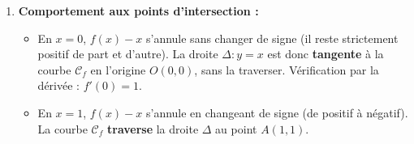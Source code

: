 \documentclass[11pt,a4paper]{article}
\begin{document}
\begin{correctionbox}[Exercice 7]
\begin{enumerate}[label=\textbf{\arabic*.}]
\begin{itemize}
        \begin{itemize}
            \item Sur $]-\infty, 0[ \cup ]0, 1[$, $f(x) - x > 0$ : la courbe $\mathcal{C}_f$ est \textbf{strictement au-dessus} de la droite $\Delta$.
            \item Sur $]1, +\infty[$, $f(x) - x < 0$ : la courbe $\mathcal{C}_f$ est \textbf{strictement au-dessous} de la droite $\Delta$.
            \item En $x = 0$, $f(0) - 0 = 0$ : $\mathcal{C}_f$ et $\Delta$ se coupent à l'origine $O(0, 0)$.
            \item En $x = 1$, $f(1) - 1 = \dfrac{e - 1}{e - 1} - 1 = 0$ : $\mathcal{C}_f$ et $\Delta$ se coupent au point $A(1, 1)$.
        \end{itemize}
    \end{itemize}

    \item \textbf{Comportement aux points d'intersection :}
    \begin{itemize}
        \item En $x = 0$, $f(x) - x$ s'annule sans changer de signe (il reste strictement positif de part et d'autre).
        La droite $\Delta : y = x$ est donc \textbf{tangente} à la courbe $\mathcal{C}_f$ en l'origine $O(0, 0)$, sans la traverser.
        Vérification par la dérivée : $f'(0) = 1$.
        \item En $x = 1$, $f(x) - x$ s'annule en changeant de signe (de positif à négatif).
        La courbe $\mathcal{C}_f$ \textbf{traverse} la droite $\Delta$ au point $A(1, 1)$.
    \end{itemize}
\end{enumerate}
\end{correctionbox}
\end{document}
